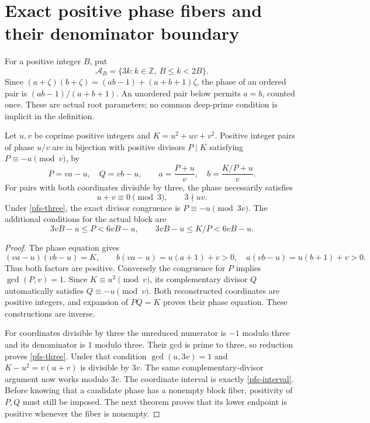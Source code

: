 \section{Exact positive phase fibers and their denominator boundary}
\label{pfs-section}

For a positive integer $B$, put
\[
 \mathcal A_B=\{3k:k\in\mathbb Z,\ B\leq k<2B\}.
\]
Since $(a+\zeta)(b+\zeta)=(ab-1)+(a+b+1)\zeta$, the phase of
an ordered pair is $(ab-1)/(a+b+1)$. An unordered pair below permits
$a=b$, counted once. These are actual root parameters; no common
deep-prime condition is implicit in the definition.

\begin{theorem}\label{pfs-divisors}
Let $u,v$ be coprime positive integers and $K=u^2+uv+v^2$.
Positive integer pairs of phase $u/v$ are in bijection with
positive divisors $P\mid K$ satisfying $P\equiv-u\pmod v$,
by
\begin{equation}\label{pfs-inverse}
 P=va-u,\quad Q=vb-u,\qquad
 a=\frac{P+u}{v},\quad b=\frac{K/P+u}{v}.
\end{equation}
For pairs with both coordinates divisible by three, the phase
necessarily satisfies
\begin{equation}\label{pfs-three}
 u+v\equiv0\pmod3,\qquad 3\nmid uv.
\end{equation}
Under \eqref{pfs-three}, the exact divisor congruence is
$P\equiv-u\pmod{3v}$. The additional conditions for the actual
block are
\begin{equation}\label{pfs-interval}
 3vB-u\leq P<6vB-u,\qquad
 3vB-u\leq K/P<6vB-u.
\end{equation}
\end{theorem}
\begin{proof}
The phase equation gives
\[
 (va-u)(vb-u)=K,\qquad
 b(va-u)=u(a+1)+v>0,\quad a(vb-u)=u(b+1)+v>0.
\]
Thus both factors are positive. Conversely the congruence for $P$
implies $\gcd(P,v)=1$. Since $K\equiv u^2\pmod v$, its complementary
divisor $Q$ automatically satisfies $Q\equiv-u\pmod v$.
Both reconstructed coordinates are positive integers, and expansion
of $PQ=K$ proves their phase equation. These constructions are inverse.

For coordinates divisible by three the unreduced numerator is $-1$
modulo three and its denominator is $1$ modulo three. Their gcd is
prime to three, so reduction proves \eqref{pfs-three}. Under that
condition $\gcd(u,3v)=1$ and $K-u^2=v(u+v)$ is divisible by $3v$.
The same complementary-divisor argument now works modulo $3v$.
The coordinate interval is exactly \eqref{pfs-interval}.
Before knowing that a candidate phase has a nonempty block fiber,
positivity of $P,Q$ must still be imposed. The next theorem proves
that its lower endpoint is positive whenever the fiber is nonempty.
\end{proof}

